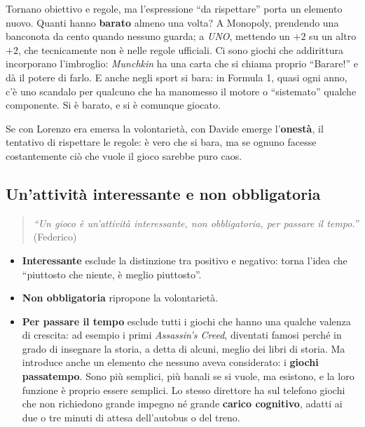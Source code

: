 Tornano obiettivo e regole, ma l'espressione ``da rispettare'' porta un
elemento nuovo. Quanti hanno \textbf{barato} almeno una volta? A Monopoly,
prendendo una banconota da cento quando nessuno guarda; a \emph{UNO}, mettendo
un $+2$ su un altro $+2$, che tecnicamente non è nelle regole ufficiali. Ci
sono giochi che addirittura incorporano l'imbroglio: \emph{Munchkin} ha una
carta che si chiama proprio ``Barare!'' e dà il potere di farlo. E anche negli
sport si bara: in Formula 1, quasi ogni anno, c'è uno scandalo per qualcuno
che ha manomesso il motore o ``sistemato'' qualche componente. Si è barato, e
si è comunque giocato.

Se con Lorenzo era emersa la volontarietà, con Davide emerge
l'\textbf{onestà}, il tentativo di rispettare le regole: è vero che si bara,
ma se ognuno facesse costantemente ciò che vuole il gioco sarebbe puro caos.

\subsection{Un'attività interessante e non obbligatoria}

\begin{quote}
\emph{``Un gioco è un'attività interessante, non obbligatoria, per passare il
tempo.''} (Federico)
\end{quote}

\begin{itemize}
  \item \textbf{Interessante} esclude la distinzione tra positivo e negativo:
        torna l'idea che ``piuttosto che niente, è meglio piuttosto''.
  \item \textbf{Non obbligatoria} ripropone la volontarietà.
  \item \textbf{Per passare il tempo} esclude tutti i giochi che hanno una
        qualche valenza di crescita: ad esempio i primi \emph{Assassin's
        Creed}, diventati famosi perché in grado di insegnare la storia, a
        detta di alcuni, meglio dei libri di storia. Ma introduce anche un
        elemento che nessuno aveva considerato: i \textbf{giochi passatempo}.
        Sono più semplici, più banali se si vuole, ma esistono, e la loro
        funzione è proprio essere semplici. Lo stesso direttore ha sul
        telefono giochi che non richiedono grande impegno né grande
        \textbf{carico cognitivo}, adatti ai due o tre minuti di attesa
        dell'autobus o del treno.
\end{itemize}

